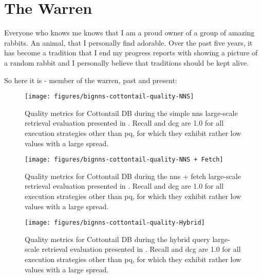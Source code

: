 \chapter{The Warren}


Everyone who knows me knows that I am a proud owner of a group of amazing rabbits. An animal, that I personally find adorable. Over the past five years, it has become a tradition that I end my progress reports with showing a picture of a random rabbit and I personally believe that traditions should be kept alive.

So here it is - member of the warren, past and present:




\begin{figure}[bt]
    \texttt{[image: figures/bignns-cottontail-quality-NNS]}
    \caption{Quality metrics for Cottontail DB during the simple \acrshort{nns} large-scale retrieval evaluation presented in . Recall and \acrshort{dcg} are 1.0 for all execution strategies other than \acrshort{pq}, for which they exhibit rather low values with a large spread.}
    \label{figure:appendix_bignns_cottontail_nns_quality}
\end{figure}

\begin{figure}[bt]
    \texttt{[image: figures/bignns-cottontail-quality-NNS + Fetch]}
    \caption{Quality metrics for Cottontail DB during the \acrshort{nns} + fetch large-scale retrieval evaluation presented in . Recall and \acrshort{dcg} are 1.0 for all execution strategies other than \acrshort{pq}, for which they exhibit rather low values with a large spread.}
    \label{figure:appendix_bignns_cottontail_nns_fetch_quality}
\end{figure}


\begin{figure}[bt]
    \texttt{[image: figures/bignns-cottontail-quality-Hybrid]}
    \caption{Quality metrics for Cottontail DB during the hybrid query large-scale retrieval evaluation presented in . Recall and \acrshort{dcg} are 1.0 for all execution strategies other than \acrshort{pq}, for which they exhibit rather low values with a large spread.}
    \label{figure:appendix_bignns_cottontail_hybrid_quality}
\end{figure}

